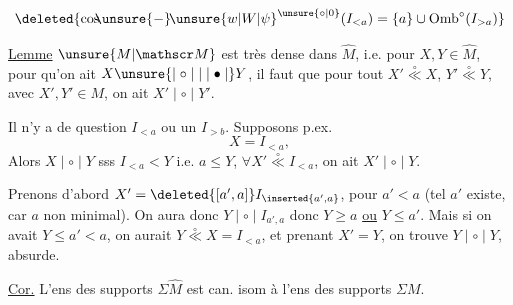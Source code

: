 
\[
\deleted{\mathrm{cos}\!\!\unsure{-}\!{\unsure{w|W|\psi}}^{\unsure{\circ|0}}(I_{<a})=\{a\}\cup\operatorname{Omb}^{\circ}(I_{>a})}
\]

\uline{Lemme} $\unsure{M|\mathscr M}$ est très dense dans $\widehat M$, i.e. pour $X,Y\in\widehat M$, pour qu'on ait $X\unsure{\mid\circ\mid|\mid\bullet\mid}Y$, il faut que pour tout $X'\overset{\circ}{\ll}X$, $Y'\overset{\circ}{\ll}Y$, avec $X',Y'\in M$, on ait $X'\mid\circ\mid Y'$.

 Il n'y a de question   $I_{<a}$ ou un $I_{>b}$. Supposons p.ex.
\[
X=I_{<a},
\]
 Alors  $X\mid\circ\mid Y$ sss $I_{<a}<Y$ i.e. $a\leq Y$,  $\forall X'\overset{\circ}{\ll}I_{<a}$, on ait $X'\mid\circ\mid Y$.


Prenons d'abord $X'=\deleted{[a',a]}I_{\inserted{a',a}}$, pour $a'<a$ (tel $a'$ existe, car $a$ non minimal). On aura donc $Y\mid\circ\mid I_{a',a}$ donc $Y\geq a$ \uline{ou} $Y\leq a'$. Mais si on avait $Y\leq a'<a$, on aurait $Y\overset{\circ}{\ll}X=I_{<a}$, et prenant $X'=Y$, on trouve $Y\mid\circ\mid Y$, absurde.


\uline{Cor.} L'ens des supports $\Sigma\widehat M$ est can. isom à l'ens des supports $\Sigma M$.
